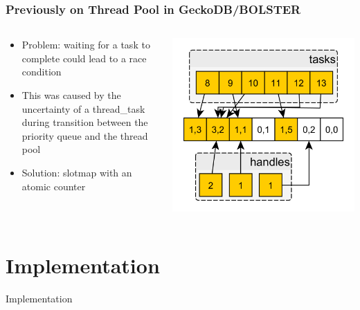 \documentclass{beamer}
\begin{document}
\begin{frame}
	\frametitle{Previously on Thread Pool in GeckoDB/BOLSTER}
	\begin{columns}
		\begin{column}{0.48\textwidth}
			\begin{itemize}
				\item Problem: waiting for a task to complete could lead to a
				race condition
				\item This was caused by the uncertainty of a thread\_task
				during transition between the priority queue and the
				thread pool
				\item Solution: slotmap with an atomic counter
			\end{itemize}
		\end{column}
		\begin{column}{0.48\textwidth}
			\includegraphics[width=1.0\textwidth]{waitingconcept.png}
		\end{column}
	\end{columns}
\end{frame}

\section{Implementation}
\begin{frame}
	\begin{center}
		\huge Implementation
	\end{center}
\end{frame}
\end{document}
